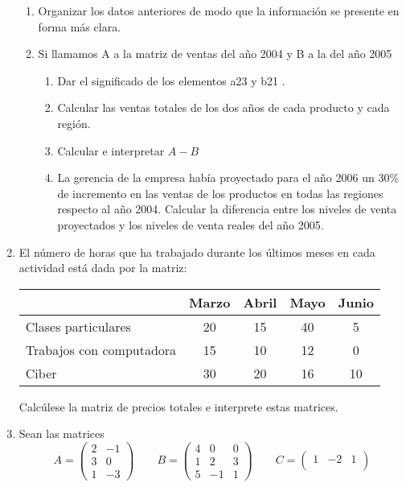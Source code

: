 \documentclass[12pt]{article}
\begin{document}
\begin{enumerate}
\begin{tabular}{ll}
\end{tabular}
\begin{enumerate}
\item Organizar los datos anteriores de modo que la información se presente en forma más clara.
\item Si llamamos A a la matriz de ventas del año 2004 y B a la del año 2005
\begin{enumerate}
  \item Dar el significado de los elementos a23 y b21 .
  \item Calcular las ventas totales de los dos años de cada producto y cada región.
  \item Calcular e interpretar $A - B$
  \item La gerencia de la empresa había proyectado para el año 2006 un 30\% de incremento en las ventas de los productos en todas las regiones respecto al año 2004. Calcular la diferencia entre los niveles de venta proyectados y los niveles
de venta reales del año 2005.
\end{enumerate}
\end{enumerate}
\item El número de horas que ha trabajado durante los últimos meses en cada actividad está dada por la matriz:
\begin{center}
\begin{tabular}{|l|c|c|c|c|}
\cline{2-5}
\multicolumn{1}{c|}{} & Marzo & Abril & Mayo & Junio \\
\hline
Clases particulares & 20 & 15 & 40 & 5 \\
\hline
Trabajos con computadora & 15 & 10 & 12 & 0 \\
\hline
Ciber & 30 & 20 & 16 & 10 \\
\hline
\end{tabular}
\end{center}
Calcúlese la matriz de precios totales e interprete estas matrices.
\item Sean las matrices
\[
A = \begin{pmatrix}
2 & -1 \\
3 & 0 \\
1 & -3
\end{pmatrix}
\qquad
B = \begin{pmatrix}
4 & 0 & 0 \\
1 & 2 & 3 \\
5 & -1 & 1
\end{pmatrix}
\qquad
C = \begin{pmatrix}
1 & -2 & 1 \\

\end{pmatrix}\]
\end{enumerate}
\end{document}

